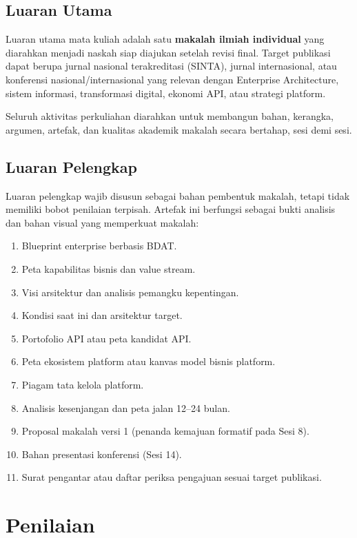 \subsection{Luaran Utama}

Luaran utama mata kuliah adalah satu \textbf{makalah ilmiah individual} yang
diarahkan menjadi naskah siap diajukan setelah revisi final. Target publikasi
dapat berupa jurnal nasional terakreditasi (SINTA), jurnal internasional, atau
konferensi nasional/internasional yang relevan dengan Enterprise Architecture,
sistem informasi, transformasi digital, ekonomi API, atau strategi platform.

Seluruh aktivitas perkuliahan diarahkan untuk membangun bahan, kerangka,
argumen, artefak, dan kualitas akademik makalah secara bertahap, sesi demi
sesi.

\subsection{Luaran Pelengkap}

Luaran pelengkap wajib disusun sebagai bahan pembentuk makalah, tetapi tidak
memiliki bobot penilaian terpisah. Artefak ini berfungsi sebagai bukti analisis
dan bahan visual yang memperkuat makalah:

\begin{enumerate}
    \item Blueprint enterprise berbasis BDAT.
    \item Peta kapabilitas bisnis dan value stream.
    \item Visi arsitektur dan analisis pemangku kepentingan.
    \item Kondisi saat ini dan arsitektur target.
    \item Portofolio API atau peta kandidat API.
    \item Peta ekosistem platform atau kanvas model bisnis platform.
    \item Piagam tata kelola platform.
    \item Analisis kesenjangan dan peta jalan 12--24 bulan.
    \item Proposal makalah versi 1 (penanda kemajuan formatif pada Sesi 8).
    \item Bahan presentasi konferensi (Sesi 14).
    \item Surat pengantar atau daftar periksa pengajuan sesuai target publikasi.
\end{enumerate}

\section{Penilaian}

